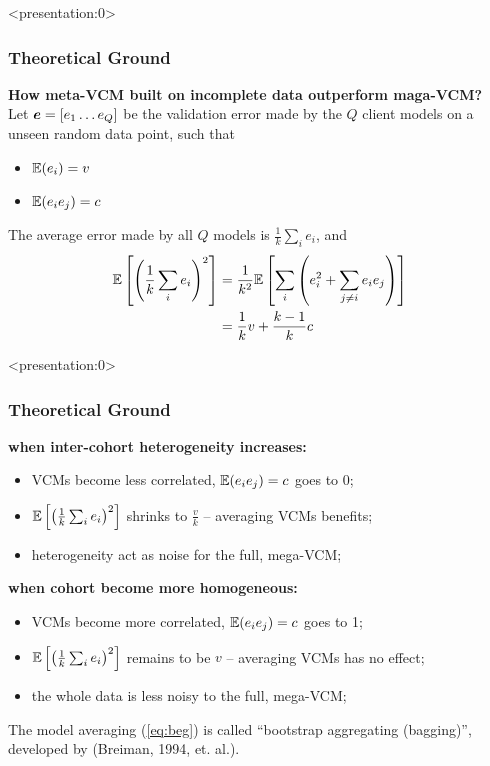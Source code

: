 \documentclass{beamer}
\begin{document}
\begin{frame} <presentation:0> %
  \frametitle{Theoretical Ground} %
  \textbf{How meta-VCM built on incomplete data outperform maga-VCM?} \\
  Let ${\bm{e}}=[e_1 \dots e_Q]$ be the validation error made by the $Q$
  client models on a unseen random data point, such that
  \begin{itemize}
  \item $\mathbb{E}(e_i) = v$
  \item $\mathbb{E}(e_i e_j) = c$
  \end{itemize}
  The average error made by all $Q$ models is $\frac{1}{k}\sum_i e_i$,
  and
  \begin{align} \label{eq:beg} \mathbb{E}\left[ \left(\frac{1}{k}\sum_i
        e_i\right)^2 \right]
    &= \frac{1}{k^2}\mathbb{E}\left[\sum_i \left(e_i^2 + \sum_{j \ne i}e_ie_j \right)  \right] \\
    &= \frac{1}{k}v + \frac{k-1}{k}c
  \end{align}
\end{frame}
\begin{frame} <presentation:0>%
  \frametitle{Theoretical Ground}%
  \textbf{when inter-cohort heterogeneity increases:}
  \begin{itemize}
  \item VCMs become less correlated, $\mathbb{E}(e_i e_j) = c$ goes to 0;
  \item $\mathbb{E}\left[ \left(\frac{1}{k}\sum_i e_i\right)^2 \right]$
    shrinks to $\frac{v}{k}$ -- averaging VCMs benefits;
  \item heterogeneity act as noise for the full, mega-VCM;
  \end{itemize}
  \textbf{when cohort become more homogeneous:}
  \begin{itemize}
  \item VCMs become more correlated, $\mathbb{E}(e_i e_j) = c$ goes to 1;
  \item $\mathbb{E}\left[ \left(\frac{1}{k}\sum_i e_i\right)^2 \right]$
    remains to be $v$ -- averaging VCMs has no effect;
  \item the whole data is less noisy to the full, mega-VCM;
  \end{itemize}
  The model averaging (\ref{eq:beg}) is called ``bootstrap aggregating
  (bagging)'', developed by (Breiman, 1994, et. al.).
\end{frame}
\end{document}
